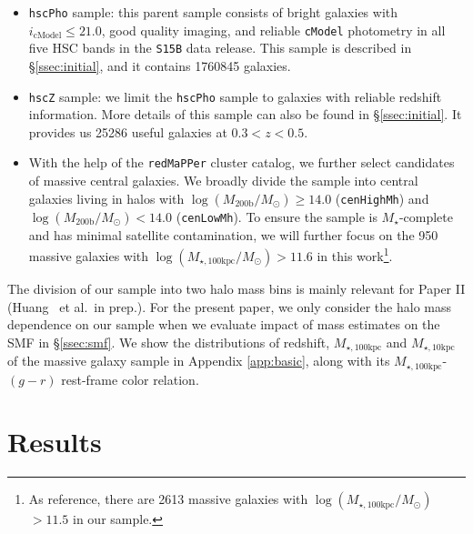 \documentclass[a4paper,fleqn,usenatbib]{mnras}
\def\etal{{\ et al.~}}
\def\redm{\texttt{redMaPPer}}
\def\rbcg{\texttt{cenHighMh}}
\def\nbcg{\texttt{cenLowMh}}
\def\mstar{{$M_{\star}$}}
\def\logmh{{$\log (M_{\mathrm{200b}}/M_{\odot})$}}
\def\minn{{$M_{\star,10\mathrm{kpc}}$}}
\def\mtot{{$M_{\star,100\mathrm{kpc}}$}}
\def\logmtot{{$\log (M_{\star,100\mathrm{kpc}}/M_{\odot})$}}
\begin{document}
    \begin{itemize}
        \item \texttt{hscPho} sample: this parent sample consists of bright galaxies 
            with $i_{\mathrm{cModel}} \leq 21.0$, good quality imaging, and reliable 
            \texttt{cModel} photometry in all five HSC bands in the \texttt{S15B} 
            data release. 
            This sample is described in \S \ref{ssec:initial}, and it contains 
            1760845 galaxies. 
        \item \texttt{hscZ} sample: we limit the \texttt{hscPho} sample to galaxies 
            with reliable redshift information. 
            More details of this sample can also be found in \S \ref{ssec:initial}. 
            It provides us 25286 useful galaxies at $0.3<z<0.5$.
        \item With the help of the \redm{} cluster catalog, we further select 
            candidates of massive central galaxies.
            We broadly divide the sample into central galaxies living in halos
            with \logmh{}$\geq 14.0$ (\rbcg{}) and \logmh{}$<14.0$ (\nbcg{}).
            To ensure the sample is \mstar{}-complete and has minimal satellite 
            contamination, we will further focus on the 950 massive galaxies with 
            \logmtot{}$>11.6$ in this work\footnote{As reference, there are 
            2613 massive galaxies with \logmtot{}$>11.5$ in our sample.}. 
           
    \end{itemize}
    
    The division of our sample into two halo mass bins is mainly relevant for Paper II
    (Huang \etal in prep.).  
    For the present paper, we only consider the halo mass dependence on our sample when 
    we evaluate impact of mass estimates on the SMF in \S \ref{ssec:smf}. 
    We show the distributions of redshift, \mtot{} and \minn{} of the massive galaxy 
    sample in Appendix \ref{app:basic}, along with its \mtot{}-$(g-r)$ rest-frame 
    color relation.



\section{Results}
    \label{sec:result}

\end{document}

